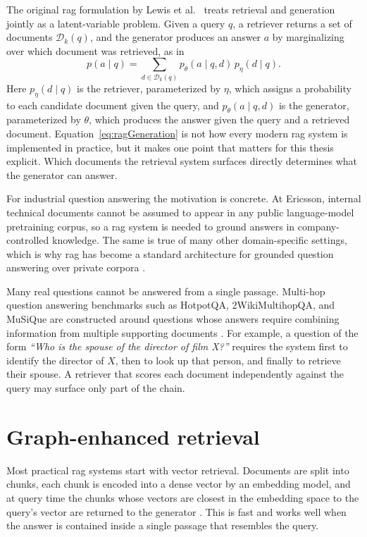 \documentclass[english, bibtex]{kththesis}               %
\numberwithin{listing}{chapter}
\begin{document}
The original \gls{rag} formulation by Lewis et al.\ \cite{lewis2020rag} treats retrieval and generation jointly as a latent-variable problem. Given a query \(q\), a retriever returns a set of documents \(\mathcal{D}_k(q)\), and the generator produces an answer \(a\) by marginalizing over which document was retrieved, as in
\begin{equation}
\label{eq:ragGeneration}
p(a \mid q) =
\sum_{d \in \mathcal{D}_k(q)}
p_\theta(a \mid q,d)\,p_\eta(d \mid q).
\end{equation}
Here \(p_\eta(d \mid q)\) is the retriever, parameterized by \(\eta\), which assigns a probability to each candidate document given the query, and \(p_\theta(a \mid q, d)\) is the generator, parameterized by \(\theta\), which produces the answer given the query and a retrieved document. Equation~\ref{eq:ragGeneration} is not how every modern \gls{rag} system is implemented in practice, but it makes one point that matters for this thesis explicit. Which documents the retrieval system surfaces directly determines what the generator can answer.

For industrial question answering the motivation is concrete. At Ericsson, internal technical documents cannot be assumed to appear in any public language-model pretraining corpus, so a \gls{rag} system is needed to ground answers in company-controlled knowledge. The same is true of many other domain-specific settings, which is why \gls{rag} has become a standard architecture for grounded question answering over private corpora \cite{gao2023ragsurvey}.

Many real questions cannot be answered from a single passage. Multi-hop question answering benchmarks such as HotpotQA, 2WikiMultihopQA, and MuSiQue are constructed around questions whose answers require combining information from multiple supporting documents \cite{yang2018hotpotqa,ho2020twowiki,trivedi2022musique}. For example, a question of the form \emph{``Who is the spouse of the director of film X?''} requires the system first to identify the director of \(X\), then to look up that person, and finally to retrieve their spouse. A retriever that scores each document independently against the query may surface only part of the chain.

\section{Graph-enhanced retrieval}
\label{sec:backgroundHybridGraph}

Most practical \gls{rag} systems start with vector retrieval. Documents are split into chunks, each chunk is encoded into a dense vector by an embedding model, and at query time the chunks whose vectors are closest in the embedding space to the query's vector are returned to the generator \cite{lewis2020rag,karpukhin2020dpr}. This is fast and works well when the answer is contained inside a single passage that resembles the query.
\end{document}
